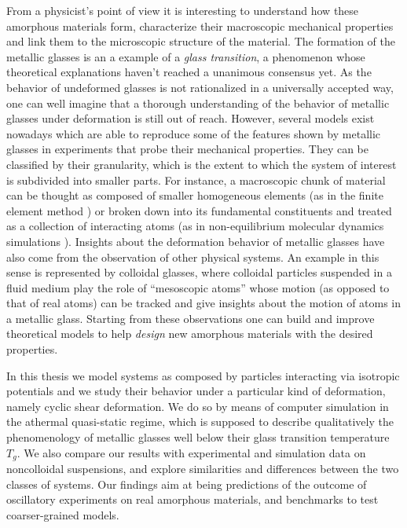 From a physicist's point of view it is interesting to understand how these amorphous materials form, characterize their macroscopic mechanical properties and link them to the microscopic structure of the material. 
The formation of the metallic glasses is an a example of a \emph{glass transition}, a phenomenon whose theoretical explanations haven't reached a unanimous consensus yet. As the behavior of undeformed glasses is not rationalized in a universally accepted way, one can well imagine that a thorough understanding of the behavior of metallic glasses under deformation is still out of reach.
However, several models exist nowadays which are able to reproduce some of the features shown by metallic glasses in experiments that probe their mechanical properties. They can be classified by their granularity, which is the extent to which the system of interest is subdivided into smaller parts. For instance, a macroscopic chunk of material can be thought as composed of smaller homogeneous elements (as in the finite element method \cite{vaidyanathan2001study}) or broken down into its fundamental constituents and treated as a collection of interacting atoms (as in non-equilibrium molecular dynamics simulations \cite{allen1989computer}).
Insights about the deformation behavior of metallic glasses have also come from the observation of other physical systems. An example in this sense is represented by colloidal glasses, where colloidal particles suspended in a fluid medium play the role of ``mesoscopic atoms'' whose motion (as opposed to that of real atoms) can be tracked \cite{schall2007structural} and give insights about the motion of atoms in a metallic glass. Starting from these observations one can build and improve theoretical models to help \emph{design} new amorphous materials with the desired properties.

In this thesis we model systems as composed by particles interacting via isotropic potentials and we study their behavior under a particular kind of deformation, namely cyclic shear deformation. We do so by means of computer simulation in the athermal quasi-static regime, which is supposed to describe qualitatively the phenomenology of metallic glasses well below their glass transition temperature $T_{g}$. We also compare our results with experimental and simulation data on noncolloidal suspensions, and explore similarities and differences between the two classes of systems. Our findings aim at being predictions of the outcome of oscillatory experiments on real amorphous materials, and benchmarks to test coarser-grained models.

